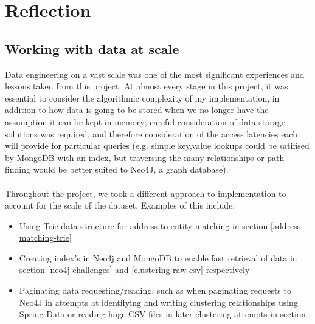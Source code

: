 \section{Reflection}

\subsection{Working with data at scale}
Data engineering on a vast scale was one of the most significant experiences and lessons taken from this project. At almost every stage in this project, it was essential to consider the algorithmic complexity of my implementation, in addition to how data is going to be stored when we no longer have the assumption it can be kept in memory; careful consideration of data storage solutions was required, and therefore consideration of the access latencies each will provide for particular queries (e.g. simple key,value lookups could be satifised by MongoDB with an index, but traversing the many relationships or path finding would be better suited to Neo4J, a graph database). 
\\\\
Throughout the project, we took a different approach to implementation to account for the scale of the dataset. Examples of this include:
\begin{itemize}
    \item Using Trie data structure for address to entity matching in section \ref{address-matching-trie}
    \item Creating index's in Neo4j and MongoDB to enable fast retrieval of data in section \ref{neo4j-challenges} and \ref{clustering-raw-csv} respectively
    \item Paginating data requesting/reading, such as when paginating requests to Neo4J in attempts at identifying and writing clustering relationships using Spring Data or reading huge CSV files in later clustering attempts in section \label{section-clustering}. 
\end{itemize}

